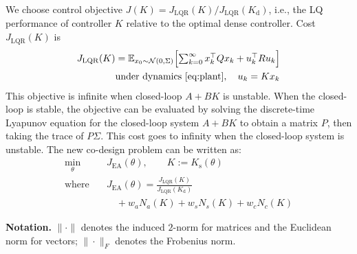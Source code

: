 \documentclass[letterpaper, 10pt, conference]{ieeeconf}
\begin{document}
We choose control objective $J(K) = J_\mathrm{LQR}(K)/J_\mathrm{LQR}(K_\mathrm{d})$, i.e., the LQ performance of controller $K$ relative to the optimal dense controller. Cost $J_\mathrm{LQR}(K)$ is
\begin{equation}
    \begin{aligned}
        J_{\mathrm{LQR}}(K) &= \mathbb{E}_{x_0 \sim \mathcal{N}(0, \Sigma)}
            \Bigl[ \textstyle\sum_{k=0}^{\infty} x_k^\top Q x_k + u_k^\top R u_k \Bigr] \\
        & \text{under dynamics } \eqref{eq:plant}, \quad u_k = Kx_k
    \end{aligned}
\end{equation}
This objective is infinite when closed-loop $A+BK$ is unstable. When the closed-loop is stable, the objective can be evaluated by solving the discrete-time Lyapunov equation for the closed-loop system $A+BK$ to obtain a matrix $P$, then taking the trace of $P\Sigma$. This cost goes to infinity when the closed-loop system is unstable. The new co-design problem can be written as:
\begin{equation} \label{eq:codesign_ours}
    \begin{aligned}
        \min_{\theta} & \quad J_\mathrm{EA}(\theta),
        \qquad K := K_\mathrm{s}(\theta) \\
        \text{where} & \quad J_\mathrm{EA}(\theta) =
            \frac{J_\mathrm{LQR}(K)}{J_\mathrm{LQR}(K_\mathrm{d})} \\
        & \quad \quad + w_a N_a(K) + w_s N_s(K) + w_c N_c(K)
    \end{aligned}
\end{equation}

\textbf{Notation.} $\|\cdot\|$ denotes the induced $2$-norm for matrices and the Euclidean norm for vectors; $\|\cdot\|_F$ denotes the Frobenius norm.
\end{document}
